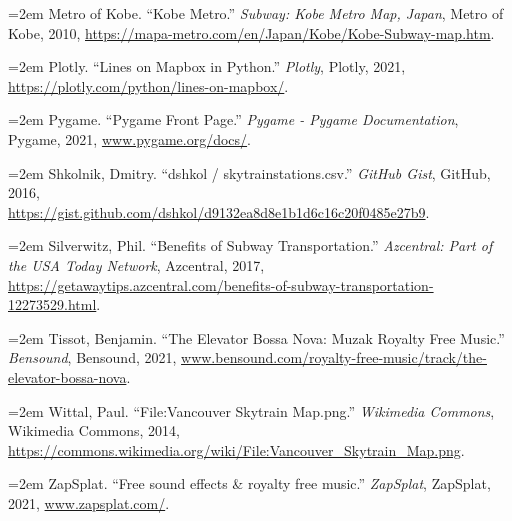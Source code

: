 \documentclass[fontsize=11pt]{article}
\begin{document}
\bigskip 
 
\hangindent=2em  
\noindent  
Metro of Kobe. ``Kobe Metro.” \textit{Subway: Kobe Metro Map, Japan}, Metro of Kobe, 2010, \url{https://mapa-metro.com/en/Japan/Kobe/Kobe-Subway-map.htm}. 

\bigskip 
 
\hangindent=2em  
\noindent  
Plotly. ``Lines on Mapbox in Python.” \textit{Plotly}, Plotly, 2021, \url{https://plotly.com/python/lines-on-mapbox/}. 

\bigskip 
 
\hangindent=2em  
\noindent  
Pygame. ``Pygame Front Page.” \textit{Pygame - Pygame Documentation}, Pygame, 2021, \url{www.pygame.org/docs/}. 

\bigskip 
 
\hangindent=2em  
\noindent  
Shkolnik, Dmitry. ``dshkol / skytrainstations.csv.” \textit{GitHub Gist}, GitHub, 2016, \\ \url{https://gist.github.com/dshkol/d9132ea8d8e1b1d6c16c20f0485e27b9}. 

\bigskip 
 
\hangindent=2em  
\noindent  
Silverwitz, Phil. ``Benefits of Subway Transportation.” \textit{Azcentral: Part of the USA Today Network}, Azcentral, 2017, \url{https://getawaytips.azcentral.com/benefits-of-subway-transportation-12273529.html}. 

\bigskip

\hangindent=2em
\noindent  
Tissot, Benjamin. ``The Elevator Bossa Nova: Muzak Royalty Free Music.” \textit{Bensound}, Bensound, 2021, \url{www.bensound.com/royalty-free-music/track/the-elevator-bossa-nova}. 

\bigskip 
 
\hangindent=2em  
\noindent  
Wittal, Paul. ``File:Vancouver Skytrain Map.png.” \textit{Wikimedia Commons}, Wikimedia Commons, 2014, \url{https://commons.wikimedia.org/wiki/File:Vancouver_Skytrain_Map.png}. 

\bigskip

\hangindent=2em
\noindent  
ZapSplat. ``Free sound effects \& royalty free music.” \textit{ZapSplat}, ZapSplat, 2021, \url{www.zapsplat.com/}. 
\end{document}
